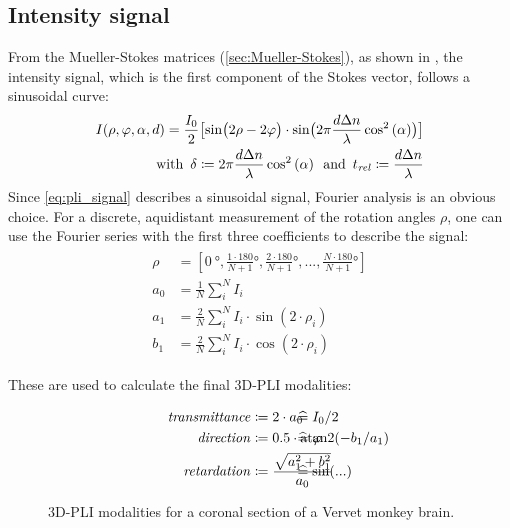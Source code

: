 \subsection{Intensity signal}
% 
From the Mueller-Stokes matrices (\cref{sec:Mueller-Stokes}), as shown in \cite{MenzelMaster,MenzelDissertation}, the intensity signal, which is the first component of the Stokes vector, follows a sinusoidal curve:
% 
\begin{align}
\label{eq:pli_signal}
\begin{split}
I(\rho, \varphi, \alpha, d) =\frac{I_0}{2}\bigl[ \sin\bigl(2\rho - 2\varphi \bigr)\cdot \sin \bigl( 2\pi\frac{d \textnormal{$\Delta n$}}{\lambda} \cos^2\left( \alpha \right) \bigr) \bigr] \\
\text{with} \enspace \delta \coloneqq 2\pi\frac{d \textnormal{$\Delta n$}}{\lambda} \cos^2\left( \alpha \right) \enspace 
\text{and} \enspace \textnormal{$t_\mathit{rel}$} \coloneqq \frac{d \textnormal{$\Delta n$}}{\lambda}
\end{split}
\end{align}
% 
Since \cref{eq:pli_signal} describes a sinusoidal signal, Fourier analysis is an obvious choice.
For a discrete, aquidistant measurement of the rotation angles $\rho$, one can use the Fourier series with the first three coefficients to describe the signal:
% 
\begin{align}
\begin{split}
\rho &= [\SI{0}{\degree}, \frac{1\cdot180}{N+1}\si{\degree}, \frac{2\cdot180}{N+1}\si{\degree}, ..., \frac{N\cdot180}{N+1}\si{\degree}]\\
a_0 &= \frac{1}{N} \sum_i^N I_i\\
a_1 &= \frac{2}{N} \sum_i^N I_i \cdot \sin(2 \cdot \rho_i)\\
b_1 &= \frac{2}{N} \sum_i^N I_i \cdot \cos(2 \cdot \rho_i)
\end{split}
\end{align}

These are used to calculate the final \ac{3D-PLI} modalities:

\begin{align}
\begin{split}
\mathit{transmittance} &\coloneqq 2 \cdot a_0 \vphantom{I_0/2} \\
\mathit{direction} &\coloneqq 0.5 \cdot \atantwo(-b_1 / a_1) \vphantom{\varphi} \\
\mathit{retardation} &\coloneqq \frac{\sqrt{a_1^2 + b_1^2}}{a_0}  \vphantom{\sin(...)} 
\end{split}
\hspace{-7em}
\begin{split}
& \mathrel{\widehat{=}} I_0/2 \vphantom{2 \cdot a_0}\\
& \mathrel{\widehat{=}} \varphi \vphantom{0.5 \cdot \atantwo(-b_1 / a_1)} \\
& \mathrel{\widehat{=}} \sin(...) \vphantom{\frac{\sqrt{a_1^2 + b_1^2}}{a_0}}
\end{split}
\end{align}
% 
% 
\begin{figure}[t]

\caption[3D-PLI modalities]{3D-PLI modalities for a coronal section of a Vervet monkey brain.}
\end{figure}
% 
% 

